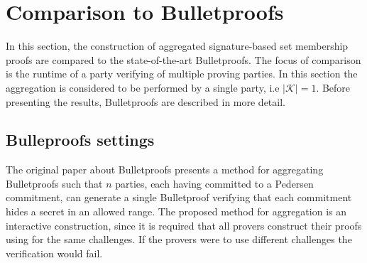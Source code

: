
\section{Comparison to Bulletproofs}
\label{sec:ComparetOBullet}
In this section, the construction of aggregated signature-based set membership proofs are compared to the state-of-the-art Bulletproofs. The focus of comparison is the runtime of a party verifying of multiple proving parties. In this section the aggregation is considered to be performed by a single party, i.e $|\mathcal{K}|=1$. Before presenting the results, Bulletproofs are described in more detail.

\subsection*{Bulleproofs settings}
The original paper about Bulletproofs \cite{bulletProofs_theory} presents a method for aggregating Bulletproofs such that $n$ parties, each having committed to a Pedersen commitment, can generate a single Bulletproof verifying that each commitment hides a secret in an allowed range. The proposed method for aggregation is an interactive construction, since it is required that all provers construct their proofs using for the same challenges. If the provers were to use different challenges the verification would fail.


